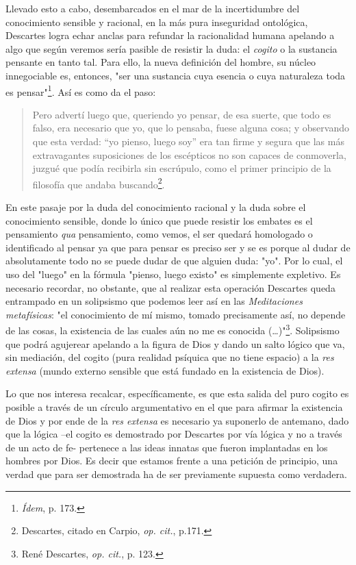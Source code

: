 Llevado esto a cabo, desembarcados en el mar de la incertidumbre del
conocimiento sensible y racional, en la más pura inseguridad ontológica,
Descartes logra echar anclas para refundar la racionalidad humana
apelando a algo que según veremos sería pasible de resistir la duda: el
\emph{cogito} o la sustancia pensante en tanto tal. Para ello, la nueva
definición del hombre, su núcleo innegociable es, entonces, "ser una
sustancia cuya esencia o cuya naturaleza toda es pensar"\footnote{\emph{Ídem},
  p. 173.}. Así es como da el paso:

\begin{quote}
Pero advertí luego que, queriendo yo pensar, de esa suerte, que todo es
falso, era necesario que yo, que lo pensaba, fuese alguna cosa; y
observando que esta verdad: ``yo pienso, luego soy'' era tan firme y
segura que las más extravagantes suposiciones de los escépticos no son
capaces de conmoverla, juzgué que podía recibirla sin escrúpulo, como el
primer principio de la filosofía que andaba buscando\footnote{Descartes,
  citado en Carpio, \emph{op. cit.}, p.171.}.
\end{quote}

En este pasaje por la duda del conocimiento racional y la duda sobre el
conocimiento sensible, donde lo único que puede resistir los embates es
el pensamiento \emph{qua} pensamiento, como vemos, el ser quedará
homologado o identificado al pensar ya que para pensar es preciso ser y
se es porque al dudar de absolutamente todo no se puede dudar de que
alguien duda: "yo". Por lo cual, el uso del "luego" en la fórmula
"pienso, luego existo" es simplemente expletivo. Es necesario recordar,
no obstante, que al realizar esta operación Descartes queda entrampado
en un solipsismo que podemos leer así en las \emph{Meditaciones
metafísicas}: "el conocimiento de mí mismo, tomado precisamente así, no
depende de las cosas, la existencia de las cuales aún no me es conocida
(\ldots)"\footnote{René Descartes, \emph{op. cit.}, p. 123.}. Solipsismo
que podrá agujerear apelando a la figura de Dios y dando un salto lógico
que va, sin mediación, del cogito (pura realidad psíquica que no tiene
espacio) a la \emph{res extensa} (mundo externo sensible que está
fundado en la existencia de Dios).

Lo que nos interesa recalcar, específicamente, es que esta salida del
puro cogito es posible a través de un círculo argumentativo en el que
para afirmar la existencia de Dios y por ende de la \emph{res extensa}
es necesario ya suponerlo de antemano, dado que la lógica --el cogito es
demostrado por Descartes por vía lógica y no a través de un acto de fe-
pertenece a las ideas innatas que fueron implantadas en los hombres por
Dios. Es decir que estamos frente a una petición de principio, una
verdad que para ser demostrada ha de ser previamente supuesta como
verdadera.

